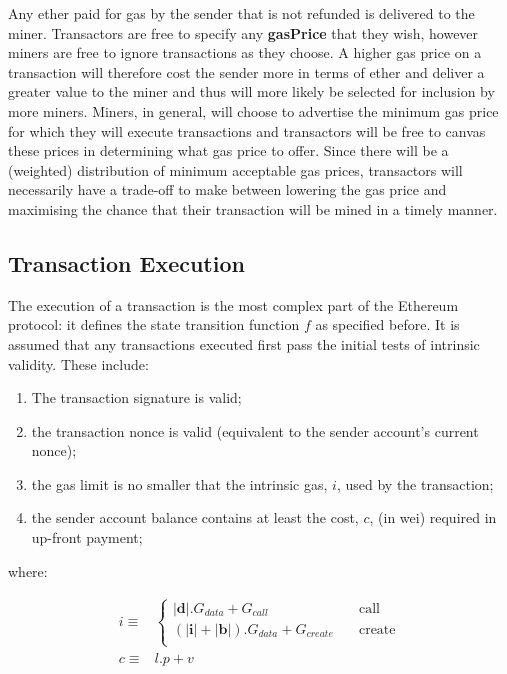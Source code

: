 \documentclass[9pt,oneside]{amsart}
\begin{document}
\begin{multicols}{2}
Any ether paid for gas by the sender that is not refunded is delivered to the miner. Transactors are free to specify any \textbf{gasPrice} that they wish, however miners are free to ignore transactions as they choose. A higher gas price on a transaction will therefore cost the sender more in terms of ether and deliver a greater value to the miner and thus will more likely be selected for inclusion by more miners. Miners, in general, will choose to advertise the minimum gas price for which they will execute transactions and transactors will be free to canvas these prices in determining what gas price to offer. Since there will be a (weighted) distribution of minimum acceptable gas prices, transactors will necessarily have a trade-off to make between lowering the gas price and maximising the chance that their transaction will be mined in a timely manner.


\subsection{Transaction Execution} \label{ch:execution}

The execution of a transaction is the most complex part of the Ethereum protocol: it defines the state transition function $f$ as specified before. It is assumed that any transactions executed first pass the initial tests of intrinsic validity. These include:

\begin{enumerate}
\item The transaction signature is valid;
\item the transaction nonce is valid (equivalent to the sender account's current nonce);
\item the gas limit is no smaller that the intrinsic gas, $i$, used by the transaction;
\item the sender account balance contains at least the cost, $c$, (in wei) required in up-front payment;
\end{enumerate}

where:

\begin{eqnarray}
i \equiv & \begin{cases}
  |\mathbf{d}|.G_{data} + G_{call} & \quad \text{call} \\
  (|\mathbf{i}| + |\mathbf{b}|).G_{data} + G_{create} & \quad \text{create} \\
\end{cases} \\
c \equiv & l.p + v
\end{eqnarray}


\end{multicols}
\end{document}
